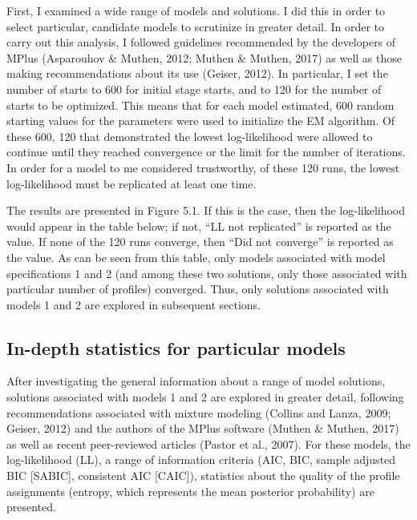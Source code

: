 \documentclass[]{msu-thesis}
\theoremstyle{definition}
\theoremstyle{definition}
\theoremstyle{definition}
\theoremstyle{remark}
\begin{document}
First, I examined a wide range of models and solutions. I did this in
order to select particular, candidate models to scrutinize in greater
detail. In order to carry out this analysis, I followed guidelines
recommended by the developers of MPlus (Asparouhov \& Muthen, 2012;
Muthen \& Muthen, 2017) as well as those making recommendations about
its use (Geiser, 2012). In particular, I set the number of starts to 600
for initial stage starts, and to 120 for the number of starts to be
optimized. This means that for each model estimated, 600 random starting
values for the parameters were used to initialize the EM algorithm. Of
these 600, 120 that demonstrated the lowest log-likelihood were allowed
to continue until they reached convergence or the limit for the number
of iterations. In order for a model to me considered trustworthy, of
these 120 runs, the lowest log-likelihood must be replicated at least
one time.

The results are presented in Figure 5.1. If this is the case, then the
log-likelihood would appear in the table below; if not, ``LL not
replicated'' is reported as the value. If none of the 120 runs converge,
then ``Did not converge'' is reported as the value. As can be seen from
this table, only models associated with model specifications 1 and 2
(and among these two solutions, only those associated with particular
number of profiles) converged. Thus, only solutions associated with
models 1 and 2 are explored in subsequent sections.

\subsection{In-depth statistics for particular
models}\label{in-depth-statistics-for-particular-models}

After investigating the general information about a range of model
solutions, solutions associated with models 1 and 2 are explored in
greater detail, following recommendations associated with mixture
modeling (Collins and Lanza, 2009; Geiser, 2012) and the authors of the
MPlus software (Muthen \& Muthen, 2017) as well as recent peer-reviewed
articles (Pastor et al., 2007). For these models, the log-likelihood
(LL), a range of information criteria (AIC, BIC, sample adjusted BIC
{[}SABIC{]}, consistent AIC {[}CAIC{]}), statistics about the quality of
the profile assignments (entropy, which represents the mean posterior
probability) are presented.
\end{document}
